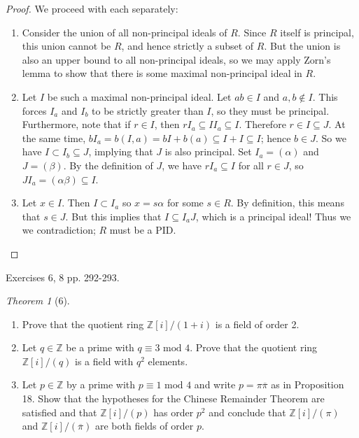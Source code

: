 \documentclass[12pt]{article}
\theoremstyle{remark}
\theoremstyle{named}
\newtheorem*{theorem}{Theorem}
\renewcommand{\a}{\alpha}
\renewcommand{\b}{\beta}
\newcommand{\Z}{\mathbb Z}
\renewcommand{\mod}{\text{ mod }}
\begin{document}
\begin{proof}
    We proceed with each separately:
    \begin{enumerate}
        \item Consider the union of all non-principal ideals of \(R\). Since \(R\) itself is principal, this union cannot be \(R\), and hence strictly a subset of \(R\). But the union is also an upper bound to all non-principal ideals, so we may apply Zorn's lemma to show that there is some maximal non-principal ideal in \(R\).
        \item Let \(I\) be such a maximal non-principal ideal. Let \(ab \in I\) and \(a, b \notin I\). This forces \(I_a\) and \(I_b\) to be strictly greater than \(I\), so they must be principal. Furthermore, note that if \(r \in I\), then \(rI_a \subseteq II_a \subseteq I \). Therefore \(r \in I \subseteq J\). At the same time, \(bI_a = b(I, a) = bI + b(a) \subseteq I + I \subseteq I\); hence \(b \in J\). So we have \(I \subset I_b \subseteq J\), implying that \(J\) is also principal. Set \(I_a = (\a)\) and \(J = (\b)\). By the definition of \(J\), we have \(r I_a \subseteq I\) for all \(r \in J\), so \(JI_a = (\a\b) \subseteq I\).
        \item Let \(x \in I\). Then \(I \subset I_a\) so \(x = s\a\) for some \(s \in R\). By definition, this means that \(s \in J\). But this implies that \(I \subseteq I_aJ\), which is a principal ideal! Thus we we contradiction; \(R\) must be a PID.
    \end{enumerate}
\end{proof}

Exercises 6, 8 pp. 292-293.

\begin{theorem}[6]
    \hspace*{0in}
    \begin{enumerate}
        \item Prove that the quotient ring \(\Z [i] / (1 + i)\) is a field of order 2.
        \item Let \(q \in \Z\) be a prime with \(q \equiv 3 \mod 4\). Prove that the quotient ring \(\Z [i] / (q)\) is a field with \(q^2\) elements.
        \item Let \(p \in \Z\) by a prime with \(p \equiv 1 \mod 4\) and write \(p = \pi \overline{\pi}\) as in Proposition 18. Show that the hypotheses for the Chinese Remainder Theorem are satisfied and that \(\Z [i] / (p)\) has order \(p^2\) and conclude that \(\Z [i] / (\pi)\) and \(\Z [i] / (\overline{\pi})\) are both fields of order \(p\).
    \end{enumerate}
\end{theorem}
\end{document}
